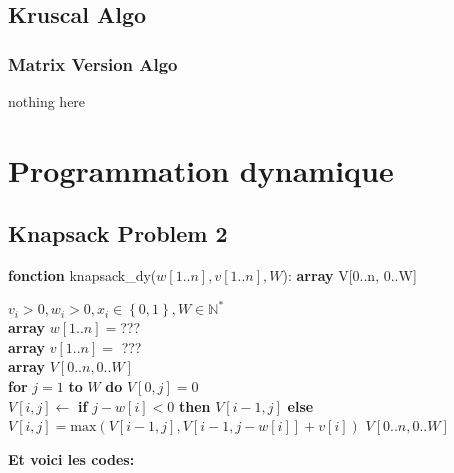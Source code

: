 \documentclass{article}
\theoremstyle{definition}
\theoremstyle{remark}
\begin{document}
    \subsection{Kruscal Algo}
    \subsubsection{Matrix Version Algo}
    nothing here


\section{Programmation dynamique}
\subsection{Knapsack Problem 2}
    \begin{algorithm} 
	\caption{\textbf{fonction} knapsack\_dy($w[1..n],v[1..n],W$): \textbf{array} V[0..n, 0..W]
} 
	\label{alg_sacados2} 
	\begin{algorithmic}
		\REQUIRE $v_{i} > 0, w_{i} > 0, x_{i} \in \left\{ 0,1 \right\}, W \in \mathbb{N}^{*} $ \\
		\textbf{array} $w[1..n] = $??? \\
		\textbf{array} $v[1..n] =$ ???\\ 
		\textbf{array} $V[0..n,0..W]$\\ 
		\textbf{for} $j = 1$ \textbf{to} $W$ \textbf{do} $V\left[ 0,j \right] = 0$\\
		\STATE $V[i,j] \gets$ \textbf{if} $j-w[i]<0 $ \textbf{then} $V[i-1,j]$ 
		\STATE \qquad\qquad\;\textbf{else} $V\left[ i,j \right] = \text{max}\left( V[i-1,j], V[i-1,j-w[i]] + v[i] \right) $
		\ENDFOR
		\ENDFOR
		\RETURN $V[0..n,0..W]$
	\end{algorithmic} 
\end{algorithm}
\textbf{Et voici les codes:}
\end{document}
